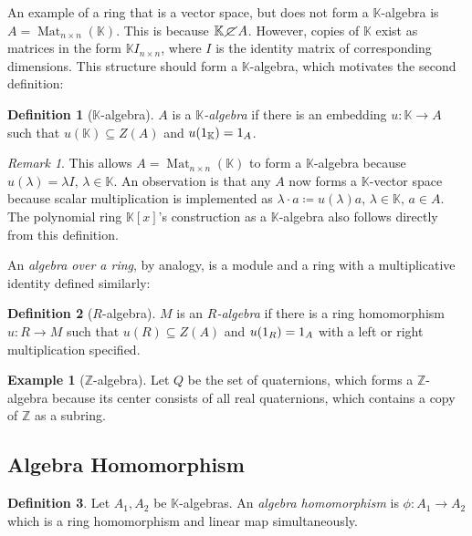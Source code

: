 \documentclass{article}
\theoremstyle{definition}
\newtheorem{Definition}{Definition}
\newtheorem*{Example*}{Example}
\theoremstyle{remark}
\newtheorem*{Remark*}{Remark}
\theoremstyle{underline}
\theoremstyle{underline}
\DeclareMathOperator{\Mat}{Mat}
\begin{document}
An example of a ring that is a vector space, but does not form a $\mathbb K$-algebra is $A = \Mat_{n\times n}(\mathbb K)$. This is because $\mathbb K\,\cancel{\subset}\,A$. However, copies of $\mathbb K$ exist as matrices in the form $\mathbb K I_{n\times n}$, where $I$ is the identity matrix of corresponding dimensions. This structure should form a $\mathbb K$-algebra, which motivates the second definition:

\begin{Definition}[$\mathbb K$-algebra]
$A$ is a $\mathbb K$\emph{-algebra} if there is an embedding $u: \mathbb K \to A$ such that $u(\mathbb K) \subseteq Z(A)$ and $u\pqty{1_{\mathbb K}} = 1_A $.
\end{Definition}

\begin{Remark*}
This allows $A = \Mat_{n\times n}(\mathbb K)$ to form a $\mathbb K$-algebra because $u(\lambda) = \lambda I,\, \lambda \in \mathbb K$. An observation is that any $A$ now forms a $\mathbb K$-vector space because scalar multiplication is implemented as $\lambda \cdot a \coloneqq u(\lambda)a,\, \lambda \in \mathbb K,\, a \in A$. The polynomial ring $\mathbb K[x]$'s construction as a $\mathbb K$-algebra also follows directly from this definition.
\end{Remark*}

An \emph{algebra over a ring}, by analogy, is a module and a ring with a multiplicative identity defined similarly:

\begin{Definition}[$R$-algebra]
$M$ is an $R$\emph{-algebra} if there is a ring homomorphism $u: R \to M$ such that $u(R) \subseteq Z(A)$ and $u\pqty{1_{R}} = 1_A $ with a left or right multiplication specified.
\end{Definition}

\begin{Example*}[$\mathbb Z$-algebra]
Let $Q$ be the set of quaternions, which forms a $\mathbb Z$-algebra because its center consists of all real quaternions, which contains a copy of $\mathbb Z$ as a subring.
\end{Example*}

\subsection{Algebra Homomorphism}

\begin{Definition}
Let $A_1, A_2$ be $\mathbb K$-algebras. An \emph{algebra homomorphism} is $\phi\colon A_1 \to A_2$ which is a ring homomorphism and linear map simultaneously. 
\end{Definition}
\end{document}
